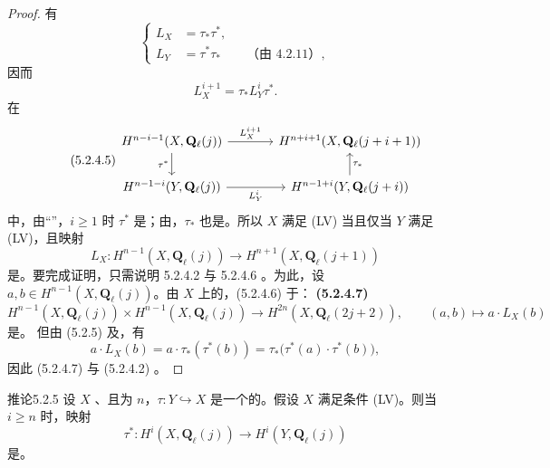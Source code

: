 \begin{proof}
有
\begin{equation}\tag{5.2.4.3}\left\{\begin{aligned}L_X&=\tau_*\tau^*,\\L_Y&=\tau^*\tau_*\qquad\text{（由 4.2.11）},\end{aligned}\right.\end{equation}
因而
\begin{equation}\tag{5.2.4.4}L_X^{i+1}=\tau_*L_Y^i\tau^*.\end{equation}
在
\begin{equation}\tag{5.2.4.5}
\begin{tikzcd}[column sep=large]
H^{n-i-1}(X,\mathbf Q_\ell(j))\arrow[r,"L_X^{i+1}"]\arrow[d,"\tau^*"']&H^{n+i+1}(X,\mathbf Q_\ell(j+i+1))\\
H^{n-1-i}(Y,\mathbf Q_\ell(j))\arrow[r,"L_Y^i"']&H^{n-1+i}(Y,\mathbf Q_\ell(j+i))\arrow[u,"\tau_*"']
\end{tikzcd}
\end{equation}
中，由“”，$i\geq1$ 时 $\tau^*$ 是；由，$\tau_*$ 也是。所以 $X$ 满足 (LV) 当且仅当 $Y$ 满足 (LV)，且映射
\begin{equation}\tag{5.2.4.6}L_X:H^{n-1}(X,\mathbf Q_\ell(j))\longrightarrow H^{n+1}(X,\mathbf Q_\ell(j+1))\end{equation}
是。要完成证明，只需说明 5.2.4.2 与 5.2.4.6 。为此，设 $a,b\in H^{n-1}(X,\mathbf Q_\ell(j))$。由 $X$ 上的，(5.2.4.6) 于：
\textbf{(5.2.4.7)} 
\[H^{n-1}(X,\mathbf Q_\ell(j))\times H^{n-1}(X,\mathbf Q_\ell(j))\longrightarrow H^{2n}(X,\mathbf Q_\ell(2j+2)),\qquad(a,b)\longmapsto a\cdot L_X(b)\]
是。
但由 (5.2.5) 及，有
\[a\cdot L_X(b)=a\cdot\tau_*(\tau^*(b))=\tau_*\bigl(\tau^*(a)\cdot\tau^*(b)\bigr),\]
因此 (5.2.4.7) 与 (5.2.4.2) 。
\end{proof}
\begin{SGAresult}{推论}{5.2.5}
设 $X$ 、且为 $n$，$\tau:Y\hookrightarrow X$ 是一个的。假设 $X$ 满足条件 (LV)。则当 $i\geq n$ 时，映射
\[\tau^*:H^i(X,\mathbf Q_\ell(j))\longrightarrow H^i(Y,\mathbf Q_\ell(j))\]
是。
\end{SGAresult}
